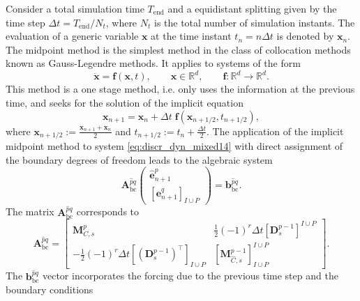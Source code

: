 \documentclass{elsarticle}
\newcommand{\bbR}{\mathbb{R}}
\newcommand*{\dual}[1]{\ensuremath{\widehat{#1}}}
\begin{document}
Consider a total simulation time $T_{\mathrm{end}}$ and a equidistant splitting given by the time step $\Delta t = T_{\mathrm{end}}/N_t$, where $N_t$ is the total number of simulation instants. The evaluation of a generic variable $\mathbf{x}$ at the time instant $t_n = n\Delta t$ is denoted by $\mathbf{x}_n$. The midpoint method is the simplest method in the class of collocation methods known as Gauss-Legendre methods. It applies to systems of the form
\begin{equation}
    \dot{\mathbf{x}} = \mathbf{f}(\mathbf{x}, t), \qquad \mathbf{x} \in \bbR^d, \qquad \mathbf{f}: \bbR^{d} \rightarrow \bbR^d.
\end{equation}
This method is a one stage method, i.e. only uses the information at the previous time, and seeks for the solution of the implicit equation
\begin{equation}
    \mathbf{x}_{n+1} = \mathbf{x}_{n} + \Delta t \; \mathbf{f}\left(\mathbf{x}_{n+1/2},  t_{n+1/2}\right),
\end{equation}
where $\mathbf{x}_{n+1/2}:= \frac{\mathbf{x}_{n+1} + \mathbf{x}_{n}}{2}$ and $t_{n+1/2}:= t_n + \frac{\Delta t}{2}$. The application of the implicit midpoint method to system \eqref{eq:discr_dyn_mixed14} with direct assignment of the boundary degrees of freedom leads to the algebraic system
\begin{equation}\label{eq:timediscr_14}
    \mathbf{A}^{\dual{p}q}_{\mathrm{bc}}
    \begin{pmatrix}
    \dual{\mathbf{e}}^p_{n+1} \\ [\mathbf{e}^q_{n+1}]_{I\cup P}
    \end{pmatrix}
    = \mathbf{b}^{\dual{p}q}_{\mathrm{bc}}.
\end{equation}
The matrix $\mathbf{A}^{\dual{p}q}_{\mathrm{bc}}$ corresponds to 
\begin{equation}
\mathbf{A}^{\dual{p}q}_{\mathrm{bc}} =
    \begin{bmatrix}
        \mathbf{M}^p_{C, s} & \frac{1}{2}(-1)^r\Delta t [\mathbf{D}^{p-1}_s]^{I\cup P} \\
        -\frac{1}{2}(-1)^r\Delta t [(\mathbf{D}_{s}^{p-1})^\top]_{I\cup P} & [\mathbf{M}^{p-1}_{\dual{C}, s}]_{I\cup P}^{I\cup P}
    \end{bmatrix}.
\end{equation}
The $\mathbf{b}^{\dual{p}q}_{\mathrm{bc}}$ vector incorporates the forcing due to the previous time step and the boundary conditions
\end{document}
